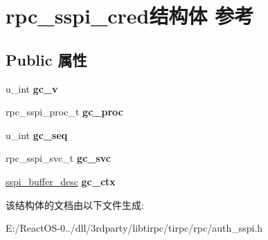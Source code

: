 \hypertarget{structrpc__sspi__cred}{}\section{rpc\+\_\+sspi\+\_\+cred结构体 参考}
\label{structrpc__sspi__cred}
\subsection*{Public 属性}
\begin{DoxyCompactItemize}
\item 
\mbox{\label{structrpc__sspi__cred_a7550d7c2a0d8ace99e80654cd74d8b20}} 
u\+\_\+int {\bfseries gc\+\_\+v}
\item 
\mbox{\label{structrpc__sspi__cred_a2899ef3e9d53763aafb4895009404b9e}} 
rpc\+\_\+sspi\+\_\+proc\+\_\+t {\bfseries gc\+\_\+proc}
\item 
\mbox{\label{structrpc__sspi__cred_aa4cbbb34f3b9877c9b52cba991156d3b}} 
u\+\_\+int {\bfseries gc\+\_\+seq}
\item 
\mbox{\label{structrpc__sspi__cred_a347611312e953b62c5e8cc60673c16ef}} 
rpc\+\_\+sspi\+\_\+svc\+\_\+t {\bfseries gc\+\_\+svc}
\item 
\mbox{\label{structrpc__sspi__cred_a8c8da5f5a449ade66ef8324759bda878}} 
\hyperlink{struct__sspi__buffer__desc}{sspi\+\_\+buffer\+\_\+desc} {\bfseries gc\+\_\+ctx}
\end{DoxyCompactItemize}


该结构体的文档由以下文件生成\+:\begin{DoxyCompactItemize}
\item 
E\+:/\+React\+O\+S-\/0../dll/3rdparty/libtirpc/tirpc/rpc/auth\+\_\+sspi.\+h\end{DoxyCompactItemize}
